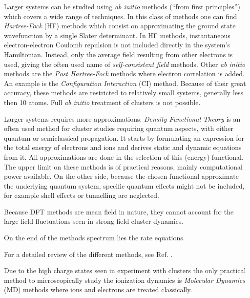 Larger systems can be studied using \textit{ab initio} methods (``from
first principles'') which covers a wide range of techniques. In this class of
methods one can find \textit{Hartree-Fock} (HF) methods which consist on
approximating the ground state wavefunction by a single Slater determinant.
In HF methods, instantaneous electron-electron Coulomb repulsion is not
included directly in the system's Hamiltonian. Instead, only the average field
resulting from other electrons is used, giving the often used name of
\textit{self-consistent field} methods. Other \textit{ab
initio} methods are the \textit{Post Hartree-Fock} methods where electron
correlation is added. An example is the \textit{Configuration Interaction} (CI)
method. Because of their great accuracy, these methods are restricted to
relatively small systems, generally less then 10 atoms. Full \textit{ab initio}
treatment of clusters is not possible.

Larger systems requires more approximations. \textit{Density Functional Theory}
is an often used method for cluster studies requiring quantum aspects, with
either quantum or semiclassical propagation. It starts by formulating an
expression for the total energy of electrons and ions and derives static and
dynamic equations from it. All approximations are done in the selection of this
(energy) functional. The upper limit on these methods is of practical reasons,
mainly computational power available. On the other side, because the chosen
functional approximate the underlying quantum system, specific quantum effects
might not be included, for example shell effects or tunnelling are neglected.

Because DFT methods are mean field in nature, they cannot account for the large
field fluctuations seen in strong field cluster dynamics.

On the end of the methods spectrum lies the rate equations.






For a detailed review of the different methods, see Ref. \cite{Fennel2010}.



Due to the high charge states seen in experiment with clusters the only
practical method to microscopically study the ionization dynamics is
\textit{Molecular Dynamics} (MD) methods where ions and electrons are treated
classically.

